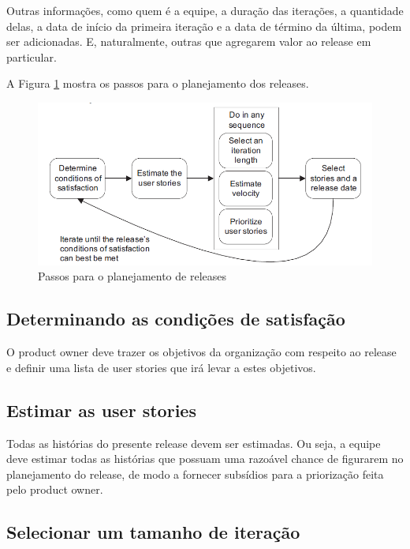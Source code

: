 \documentclass[a4paper,abntfigtabnum,noindentfirst]{abnt}
\begin{document}
Outras informações, como quem é a equipe, a duração das iterações, a quantidade delas, a data de início da primeira iteração e a data de término da última, podem ser adicionadas. E, naturalmente, outras que agregarem valor ao release em particular.

A Figura \ref{passos-para-o-planejamento-de-releases} mostra os passos para o planejamento dos releases.

\begin{figure}
	\caption{Passos para o planejamento de releases}
	\label{passos-para-o-planejamento-de-releases}
	\begin{center}
	\includegraphics[scale=0.6]{passos-para-o-planejamento-de-releases}
	\end{center}
\end{figure}


\subsection{Determinando as condições de satisfação}

O product owner deve trazer os objetivos da organização com respeito ao release e definir uma lista de user stories que irá levar a estes objetivos.


\subsection{Estimar as user stories}

Todas as histórias do presente release devem ser estimadas. Ou seja, a equipe deve estimar todas as histórias que possuam uma razoável chance de figurarem no planejamento do release, de modo a fornecer subsídios para a priorização feita pelo product owner.


\subsection{Selecionar um tamanho de iteração}
\end{document}
